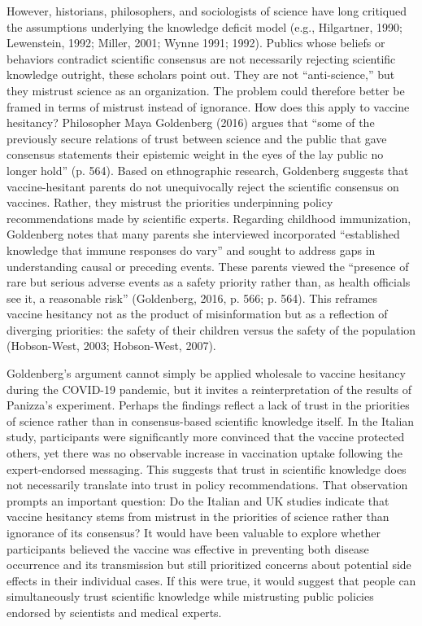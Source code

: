 \documentclass[authordate, empirical]{jote-new-article}
\begin{document}
	However, historians, philosophers, and sociologists of science have long critiqued the assumptions underlying the knowledge deficit model (e.g., Hilgartner, 1990; Lewenstein, 1992; Miller, 2001; Wynne 1991; 1992). Publics whose beliefs or behaviors contradict scientific consensus are not necessarily rejecting scientific knowledge outright, these scholars point out. They are not “anti-science,” but they mistrust science as an organization. The problem could therefore better be framed in terms of mistrust instead of ignorance. How does this apply to vaccine hesitancy? Philosopher Maya Goldenberg (2016) argues that “some of the previously secure relations of trust between science and the public that gave consensus statements their epistemic weight in the eyes of the lay public no longer hold” (p. 564). Based on ethnographic research, Goldenberg suggests that vaccine-hesitant parents do not unequivocally reject the scientific consensus on vaccines. Rather, they mistrust the priorities underpinning policy recommendations made by scientific experts. Regarding childhood immunization, Goldenberg notes that many parents she interviewed incorporated “established knowledge that immune responses do vary” and sought to address gaps in understanding causal or preceding events. These parents viewed the “presence of rare but serious adverse events as a safety priority rather than, as health officials see it, a reasonable risk” (Goldenberg, 2016, p. 566; p. 564). This reframes vaccine hesitancy not as the product of misinformation but as a reflection of diverging priorities: the safety of their children versus the safety of the population (Hobson-West, 2003; Hobson-West, 2007).







	Goldenberg's argument cannot simply be applied wholesale to vaccine hesitancy during the COVID-19 pandemic, but it invites a reinterpretation of the results of Panizza's experiment. Perhaps the findings reflect a lack of trust in the priorities of science rather than in consensus-based scientific knowledge itself. In the Italian study, participants were significantly more convinced that the vaccine protected others, yet there was no observable increase in vaccination uptake following the expert-endorsed messaging. This suggests that trust in scientific knowledge does not necessarily translate into trust in policy recommendations. That observation prompts an important question: Do the Italian and UK studies indicate that vaccine hesitancy stems from mistrust in the priorities of science rather than ignorance of its consensus? It would have been valuable to explore whether participants believed the vaccine was effective in preventing both disease occurrence and its transmission but still prioritized concerns about potential side effects in their individual cases. If this were true, it would suggest that people can simultaneously trust scientific knowledge while mistrusting public policies endorsed by scientists and medical experts.
\end{document}
